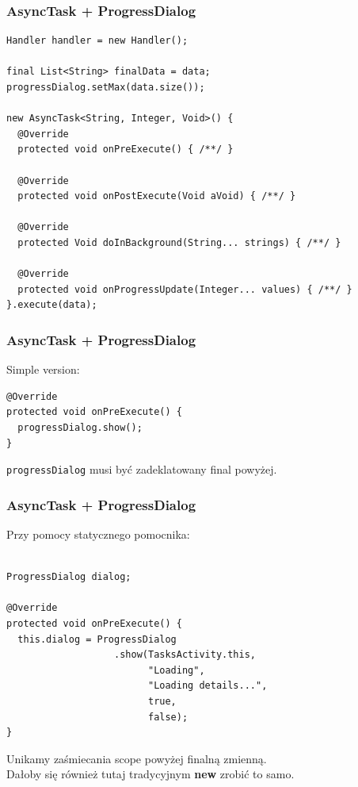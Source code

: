 \documentclass{beamer}
\begin{document}

\begin{frame}[fragile]\frametitle{AsyncTask + ProgressDialog}
\begin{lstlisting}
Handler handler = new Handler();

final List<String> finalData = data;
progressDialog.setMax(data.size());

new AsyncTask<String, Integer, Void>() {
  @Override
  protected void onPreExecute() { /**/ }

  @Override
  protected void onPostExecute(Void aVoid) { /**/ }

  @Override
  protected Void doInBackground(String... strings) { /**/ }

  @Override
  protected void onProgressUpdate(Integer... values) { /**/ }
}.execute(data);
\end{lstlisting}
\end{frame}

\begin{frame}[fragile]\frametitle{AsyncTask + ProgressDialog}
Simple version: 
\begin{lstlisting}
@Override
protected void onPreExecute() {
  progressDialog.show();
}
\end{lstlisting}
\verb|progressDialog| musi być zadeklatowany final powyżej.
\end{frame}

\begin{frame}[fragile]\frametitle{AsyncTask + ProgressDialog}
Przy pomocy statycznego pomocnika:
\begin{lstlisting}

ProgressDialog dialog;

@Override
protected void onPreExecute() {
  this.dialog = ProgressDialog
                   .show(TasksActivity.this, 
                         "Loading", 
                         "Loading details...", 
                         true, 
                         false);
}
\end{lstlisting}
Unikamy zaśmiecania scope powyżej finalną zmienną.\\
Dałoby się również tutaj tradycyjnym \textbf{new} zrobić to samo.
\end{frame}
\end{document}
